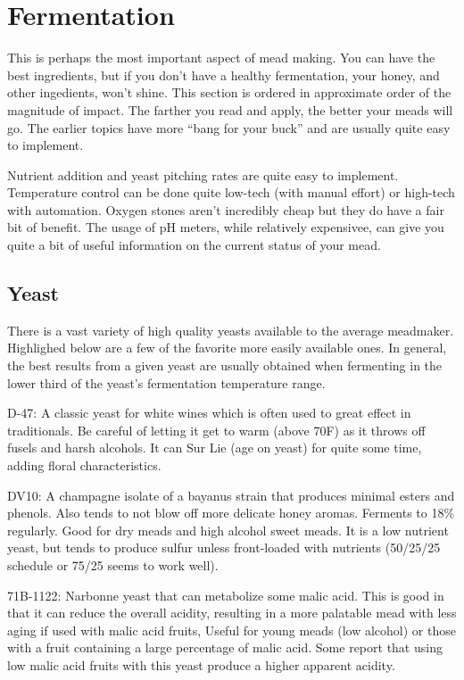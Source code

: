\documentclass{article}
\begin{document}
\section{Fermentation}
 This is perhaps the most important aspect of mead making. You can have the best ingredients, but if you don't have a healthy fermentation, your honey, and other ingedients,
 won't shine. This section is ordered in approximate order of the magnitude of impact. The farther you read and apply, the better your meads will go. The earlier topics have
 more ``bang for your buck'' and are  usually quite easy to implement. 

 Nutrient addition and yeast pitching rates are quite easy to implement. Temperature control can be done quite low-tech (with manual effort) or high-tech with automation. 
 Oxygen stones aren't incredibly cheap but they do have a fair bit of benefit. The usage of pH meters, while relatively expensivee, can give you quite a bit of useful
 information on the current status of your mead.
 \subsection{Yeast}
  There is a vast variety of high quality yeasts available to the average meadmaker. Highlighed below are a few of the favorite more easily available ones.
  In general, the best results from a given yeast are usually obtained when fermenting in the lower third of the yeast's fermentation temperature range.

  D-47: A classic yeast for white wines which is often used to great effect in traditionals. Be careful of letting it get to warm (above 70\textdegree F) as it throws off fusels and harsh alcohols. It can Sur Lie (age on yeast) for quite some time, adding floral characteristics.

  DV10: A champagne isolate of a bayanus strain that produces minimal esters and phenols. Also tends to not blow off more delicate honey aromas. 
  Ferments to 18\% regularly. Good for dry meads and high alcohol sweet meads. It is a low nutrient yeast, but tends to produce sulfur unless 
  front-loaded with nutrients (50/25/25 schedule or 75/25 seems to work well).

  71B-1122: Narbonne yeast that can metabolize some malic acid. 
   This is good in that it can reduce the overall acidity, resulting in a more palatable mead with less aging if used with malic acid fruits,
   Useful for young meads (low alcohol) or those with a fruit containing a large percentage of malic acid. 
   Some report that using low malic acid fruits with this yeast produce a higher apparent acidity.
\end{document}
